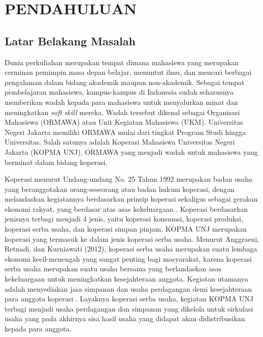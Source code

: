 
\chapter{PENDAHULUAN}

\section{Latar Belakang Masalah}
Dunia perkuliahan merupakan tempat dimana mahasiswa yang merupakan cerminan pemimpin masa depan belajar, menuntut ilmu, dan mencari berbagai pengalaman dalam bidang akademik maupun non-akademik. Sebagai tempat pembelajaran mahasiswa, kampus-kampus di Indonesia sudah seharusnya memberikan wadah kepada para mahasiswa untuk menyalurkan minat dan meningkatkan \emph{soft skill} mereka. Wadah tersebut dikenal sebagai Organisasi Mahasiswa (ORMAWA) atau Unit Kegiatan Mahasiswa (UKM). Universitas Negeri Jakarta memiliki ORMAWA mulai dari tingkat Program Studi hingga Universitas. Salah satunya adalah Koperasi Mahasiswa Universitas Negeri Jakarta (KOPMA UNJ), ORMAWA yang menjadi wadah untuk mahasiswa yang berminat dalam bidang koperasi.

Koperasi menurut Undang-undang No. 25 Tahun 1992 merupakan badan usaha yang beranggotakan orang-seseorang atau badan hukum koperasi, dengan melandaskan kegiatannya berdasarkan prinsip koperasi sekaligus sebagai gerakan ekonomi rakyat, yang berdasar atas asas kekeluargaan \cite{uu25}. Koperasi berdasarkan jenisnya terbagi menjadi 4 jenis, yaitu koperasi konsumsi, koperasi produksi, koperasi serba usaha, dan koperasi simpan pinjam. KOPMA UNJ merupakan koperasi yang termasuk ke dalam jenis koperasi serba usaha. Menurut Anggraeni, Retnadi, dan Kurniawati (2012), koperasi serba usaha merupakan suatu lembaga ekonomi kecil-menengah yang sangat penting bagi masyarakat, karena koperasi serba usaha merupakan suatu usaha bersama yang berlandaskan asas kekeluargaan untuk meningkatkan kesejahteraan anggota. Kegiatan utamanya adalah menyediakan jasa simpanan dan usaha perdagangan demi kesejahteraan para anggota koperasi \cite{anggraeni}. Layaknya koperasi serba usaha, kegiatan KOPMA UNJ terbagi menjadi usaha perdagangan dan simpanan yang dikelola untuk sirkulasi usaha yang pada akhirnya sisa hasil usaha yang didapat akan didistribusikan kepada para anggota.

